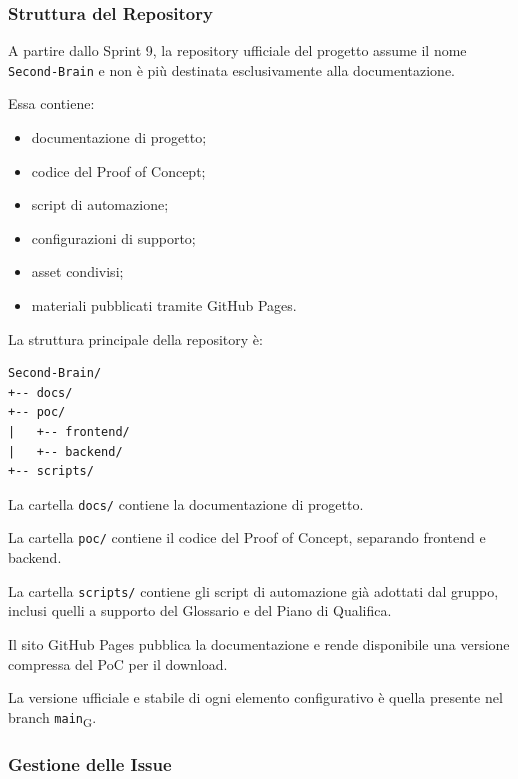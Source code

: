 
\subsubsection{Struttura del Repository}

A partire dallo Sprint 9, la repository ufficiale del progetto assume il nome
\texttt{Second-Brain} e non è più destinata esclusivamente alla documentazione.

Essa contiene:

\begin{itemize}
    \item documentazione di progetto;
    \item codice del Proof of Concept;
    \item script di automazione;
    \item configurazioni di supporto;
    \item asset condivisi;
    \item materiali pubblicati tramite GitHub Pages.
\end{itemize}

La struttura principale della repository è:

\begin{verbatim}
Second-Brain/
+-- docs/
+-- poc/
|   +-- frontend/
|   +-- backend/
+-- scripts/
\end{verbatim}

La cartella \texttt{docs/} contiene la documentazione di progetto.

La cartella \texttt{poc/} contiene il codice del Proof of Concept, separando
frontend e backend.

La cartella \texttt{scripts/} contiene gli script di automazione già adottati dal
gruppo, inclusi quelli a supporto del Glossario e del Piano di Qualifica.

Il sito GitHub Pages pubblica la documentazione e rende disponibile una versione
compressa del PoC per il download.

La versione ufficiale e stabile di ogni elemento configurativo è quella presente
nel branch \texttt{main}\textsubscript{G}.


\subsubsection{Gestione delle Issue}

